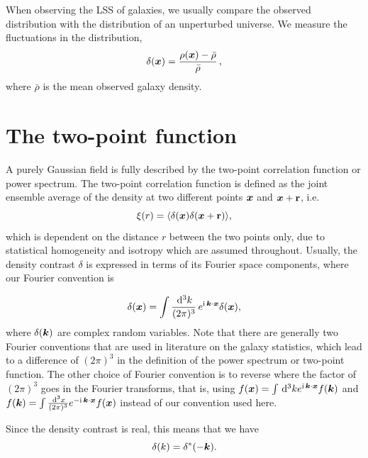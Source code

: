 When observing the LSS of galaxies, we usually compare the observed distribution with the distribution of an unperturbed universe. We measure the fluctuations in the distribution, 
\begin{equation}
	\delta(\bm {x}) = \frac{\rho(\bm {x}) - \bar{\rho}}{\bar{\rho}}\,,
\end{equation}
where $\bar{\rho}$ is the mean observed galaxy density. 


\section{The two-point function}

A purely Gaussian field is fully described by the two-point correlation function or power spectrum. The two-point correlation function is defined as the joint ensemble average of the density at two different points $\bm {x}$ and $\bm {x} + \textbf{r}$, i.e. 
\begin{equation}
	\xi(r) = \langle \delta(\bm {x}) \delta(\bm {x} + \textbf{r}) \rangle,
\end{equation}
which is dependent on the distance $r$ between the two points only, due to statistical homogeneity and isotropy which are assumed throughout. Usually, the density contrast $\delta$ is expressed in terms of its Fourier space components, where our Fourier convention is 

\begin{equation}
	\delta({\bm {x}}) = \int \frac{\,\mathrm{d}^3k}{(2\pi)^3} \, e^{\mathrm{i\,} \bm {k} \cdot \bm {x} } \delta(\bm {x}),
\end{equation}
where $\delta(\bm {k})$ are complex random variables. Note that there are generally two Fourier conventions that are used in literature on the galaxy statistics, which lead to a difference of $(2\pi)^3$ in the definition of the power spectrum or two-point function. The other choice of Fourier convention is to reverse where the factor of $(2\pi)^3$ goes in the Fourier transforms, that is, using $f(\bm {x}) = \int \,\mathrm{d}^3k e^{\mathrm{i\,} \bm {k} \cdot \bm {x}} f(\bm {k}) $ and $f(\bm {k}) = \int \frac{\,\mathrm{d}^3 x}{(2\pi)^3} e^{-\mathrm{i\,} \bm {k} \cdot \bm {x}} f(\bm {x})$ instead of our convention used here.

Since the density contrast is real, this means that we have
\begin{equation}
	\delta(k) = \delta^*(-\bm {k}).
\end{equation}

